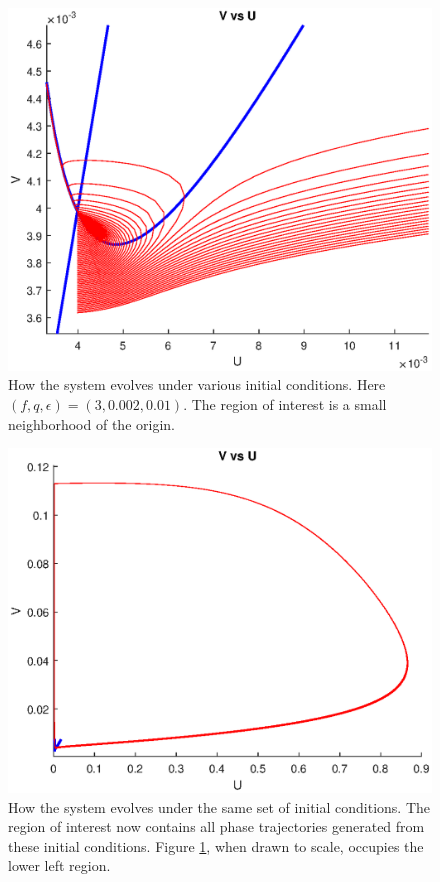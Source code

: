 \documentclass[twocolumn,amsmath,amssymb,aps]{revtex4}
\begin{document}
\begin{figure}[!htb]
	\centering
	\includegraphics[scale=0.55]{excite_1.eps}
	\caption{How the system evolves under various initial conditions. Here $(f,q,\epsilon) = (3,0.002, 0.01)$. The region of interest is a small neighborhood of the origin.}
	\label{fig:Excite1}
\end{figure}
\begin{figure}[!htb]
	\centering
	\includegraphics[scale=0.5]{excite_22.eps}
	\caption{How the system evolves under the same set of initial conditions. The region of interest now contains all phase trajectories generated from these initial conditions. Figure \ref{fig:Excite1}, when drawn to scale, occupies the lower left region.}
	\label{fig:Excite2}
\end{figure}
\end{document}
